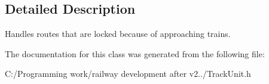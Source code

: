 \subsection{Detailed Description}
Handles routes that are locked because of approaching trains. 

The documentation for this class was generated from the following file\+:\begin{DoxyCompactItemize}
\item 
C\+:/\+Programming work/railway development after v2../Track\+Unit.\+h\end{DoxyCompactItemize}
